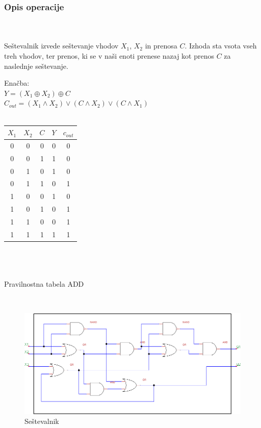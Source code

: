\documentclass[seminar, slovene]{FRIreport}
\begin{document}
\subsubsection{Opis operacije}\ \\ \ \\
Seštevalnik izvede seštevanje vhodov $X_1$, $X_2$ in prenosa $C$. Izhoda sta vsota vseh treh vhodov, ter prenos, ki se v naši enoti prenese nazaj kot prenos $C$ za naslednje seštevanje.
\ \\
\begin{table}[H]
\begin{center}
Enačba:\\
$Y = (X_1 \oplus X_2) \oplus C$\\
$C_{out} = (X_1 \wedge X_2) \vee (C \wedge X_2) \vee (C \wedge X_1) $\\ \ \\
\begin{tabular}{ | c | c | c || c | c | }\hline
$X_1$ & $X_2$ & $C$ & $Y$ & $c_{out}$ \\ \hline
0 & 0 & 0 & 0 & 0\\
0 & 0 & 1 & 1 & 0\\
0 & 1 & 0 & 1 & 0\\
0 & 1 & 1 & 0 & 1\\
1 & 0 & 0 & 1 & 0\\
1 & 0 & 1 & 0 & 1\\
1 & 1 & 0 & 0 & 1\\
1 & 1 & 1 & 1 & 1\\ \hline
\end{tabular}\\ \ \\ \ \\
Pravilnostna tabela ADD
\end{center}
\end{table}
\ \\
\begin{figure}[H]
\includegraphics[width=14cm]{vezja/img/adder}
\caption{Seštevalnik}
\label{sestevalnik}
\end{figure}
\end{document}
